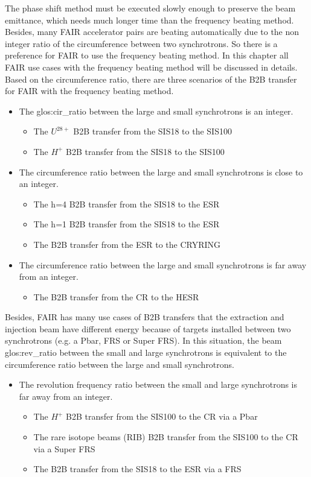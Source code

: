 The phase shift method must be executed slowly enough to preserve the beam emittance, which needs much longer time than the frequency beating method. Besides, many FAIR accelerator pairs are beating automatically due to the non integer ratio of the circumference between two synchrotrons. So there is a preference for FAIR to use the frequency beating method. In this chapter all FAIR use cases with the frequency beating method will be discussed in details. Based on the circumference ratio, there are three scenarios of the B2B transfer for FAIR with the frequency beating method. 
\begin{itemize}
	\item The \gls{glos:cir_ratio} between the large and small synchrotrons is an integer.
		\begin{itemize}
			\item	The $U^{28+}$ B2B transfer from the SIS18 to the SIS100
			\item The $H^{+}$ B2B transfer from the SIS18 to the SIS100

		\end{itemize}
	\item The circumference ratio between the large and small synchrotrons is close to an integer.
		\begin{itemize}
			\item The h=4 B2B transfer from the SIS18 to the ESR
			\item The h=1 B2B transfer from the SIS18 to the ESR
			\item The B2B transfer from the ESR to the CRYRING
		\end{itemize}
 	\item The circumference ratio between the large and small synchrotrons is far away from an integer.
		\begin{itemize}
			\item The B2B transfer from the CR to the HESR
		\end{itemize}
\end{itemize}
Besides, FAIR has many use cases of B2B transfers that the extraction and injection beam have different energy because of targets installed between two synchrotrons (e.g. a Pbar, FRS or Super FRS). In this situation, the beam \gls{glos:rev_ratio} between the small and large synchrotrons is equivalent to the circumference ratio between the large and small synchrotrons. 

\begin{itemize}

 	\item The revolution frequency ratio between the small and large synchrotrons is far away from an integer.
		\begin{itemize}
			\item The $H^{+}$ B2B transfer from the SIS100 to the CR via a Pbar
			\item The rare isotope beams (\gls{RIB}) B2B transfer from the SIS100 to the CR via a Super FRS
			\item The B2B transfer from the SIS18 to the ESR via a FRS
		\end{itemize}
\end{itemize}
  

